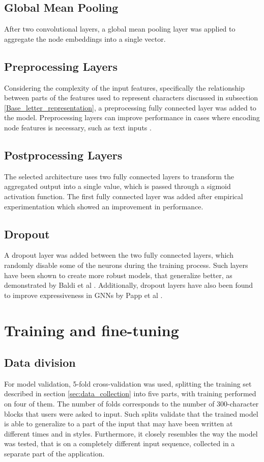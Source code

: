 \subsection{Global Mean Pooling}
After two convolutional layers, a global mean pooling layer was applied to aggregate the node embeddings into a single vector. 


\subsection{Preprocessing Layers}
Considering the complexity of the input features, specifically the relationship between parts of the features used to represent characters discussed in subsection \ref{Base_letter_representation}, a preprocessing fully connected layer was added to the model. Preprocessing layers can improve performance in cases where encoding node features is necessary, such as text inputs \cite{Lesk2024}.

\subsection{Postprocessing Layers}
The selected architecture uses two fully connected layers to transform the aggregated output into a single value, 
which is passed through a sigmoid activation function. The first fully connected layer was added after empirical experimentation which showed an improvement in performance.


\subsection{Dropout}
A dropout layer was added between the two fully connected layers, which randomly disable some of the neurons during the training process. Such layers have been shown to create more robust models, that generalize better, as demonstrated by Baldi et al \cite{NIPS2013_71f6278d}. Additionally, dropout layers have also been found to improve expressiveness in GNNs by Papp et al \cite{NEURIPS2021_b8b2926b}.

\section{Training and fine-tuning}

\subsection{Data division}
For model validation, 5-fold cross-validation was used, splitting the training set described in section \ref{sec:data_collection} into five parts, with training performed on four of them. The number of folds corresponds to the number of 300-character blocks that users were asked to input. Such splits validate that the trained model is able to generalize to a part of the input that may have been written at different times and in styles. Furthermore, it closely resembles the way the model was tested, that is on a completely different input sequence, collected in a separate part of the application.  

